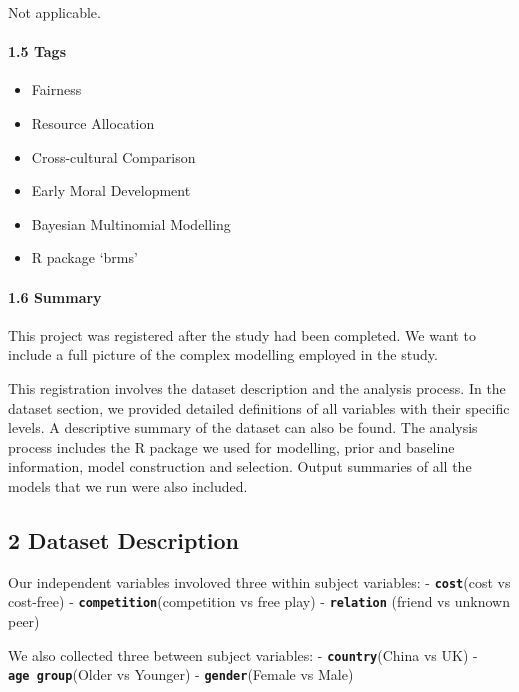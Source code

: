 \documentclass[
]{article}
\providecommand{\tightlist}{%
  \setlength{\itemsep}{0pt}\setlength{\parskip}{0pt}}
\begin{document}
Not applicable.

\hypertarget{tags}{%
\paragraph{1.5 Tags}\label{tags}}

\begin{itemize}
\tightlist
\item
  Fairness
\item
  Resource Allocation
\item
  Cross-cultural Comparison
\item
  Early Moral Development
\item
  Bayesian Multinomial Modelling
\item
  R package `brms'
\end{itemize}

\hypertarget{summary}{%
\paragraph{1.6 Summary}\label{summary}}

This project was registered after the study had been completed. We want
to include a full picture of the complex modelling employed in the
study.

This registration involves the dataset description and the analysis
process. In the dataset section, we provided detailed definitions of all
variables with their specific levels. A descriptive summary of the
dataset can also be found. The analysis process includes the R package
we used for modelling, prior and baseline information, model
construction and selection. Output summaries of all the models that we
run were also included.

\hypertarget{dataset-description}{%
\subsection{2 Dataset Description}\label{dataset-description}}

Our independent variables involoved three within subject variables: -
\textbf{\texttt{cost}}(cost vs cost-free) -
\textbf{\texttt{competition}}(competition vs free play) -
\textbf{\texttt{relation}} (friend vs unknown peer)

We also collected three between subject variables: -
\textbf{\texttt{country}}(China vs UK) -
\textbf{\texttt{age\ group}}(Older vs Younger) -
\textbf{\texttt{gender}}(Female vs Male)
\end{document}
